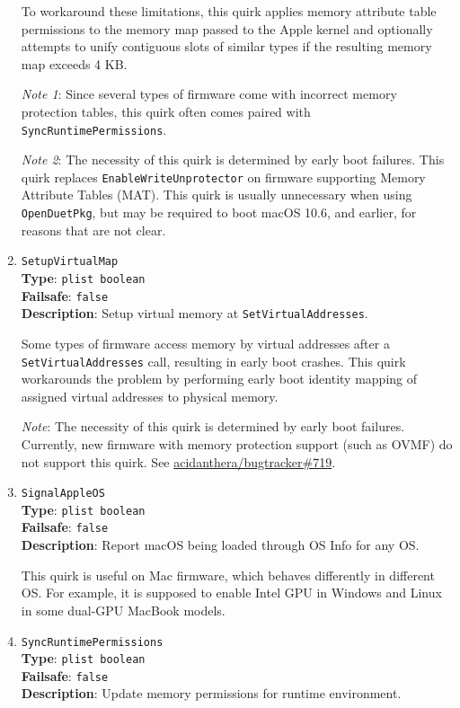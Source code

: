 \documentclass[]{article}
\begin{document}
\begin{enumerate}
  To workaround these limitations, this quirk applies memory attribute table
  permissions to the memory map passed to the Apple kernel and optionally attempts
  to unify contiguous slots of similar types if the resulting memory map exceeds
  4 KB.

  \emph{Note 1}: Since several types of firmware come with incorrect memory protection
  tables, this quirk often comes paired with \texttt{SyncRuntimePermissions}.

  \emph{Note 2}: The necessity of this quirk is determined by early boot failures.
  This quirk replaces \texttt{EnableWriteUnprotector} on firmware supporting
  Memory Attribute Tables (MAT). This quirk is usually unnecessary when using
  \texttt{OpenDuetPkg}, but may be required to boot macOS 10.6, and earlier, for
  reasons that are not clear.

\item
  \texttt{SetupVirtualMap}\\
  \textbf{Type}: \texttt{plist\ boolean}\\
  \textbf{Failsafe}: \texttt{false}\\
  \textbf{Description}: Setup virtual memory at \texttt{SetVirtualAddresses}.

  Some types of firmware access memory by virtual addresses after a \texttt{SetVirtualAddresses}
  call, resulting in early boot crashes. This quirk workarounds the problem by
  performing early boot identity mapping of assigned virtual addresses to physical
  memory.

  \emph{Note}: The necessity of this quirk is determined by early boot failures. Currently,
  new firmware with memory protection support (such as OVMF) do not support this quirk. See
  \href{https://github.com/acidanthera/bugtracker/issues/719}{acidanthera/bugtracker\#719}.

\item
  \texttt{SignalAppleOS}\\
  \textbf{Type}: \texttt{plist\ boolean}\\
  \textbf{Failsafe}: \texttt{false}\\
  \textbf{Description}: Report macOS being loaded through OS Info for any OS.

  This quirk is useful on Mac firmware, which behaves differently in different OS.
  For example, it is supposed to enable Intel GPU in Windows and Linux in some
  dual-GPU MacBook models.

\item
  \texttt{SyncRuntimePermissions}\\
  \textbf{Type}: \texttt{plist\ boolean}\\
  \textbf{Failsafe}: \texttt{false}\\
  \textbf{Description}: Update memory permissions for runtime environment.


\end{enumerate}
\end{document}
